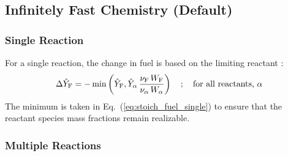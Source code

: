 %
%

\subsection{Infinitely Fast Chemistry (Default)}


\subsubsection{Single Reaction}
For a single reaction, the change in fuel is based on the limiting reactant \cite{Poinsot:TNC}:
\begin{equation}\label{eq:stoich_fuel_single}
\Delta \hat{Y}_{\rm F} = -\min \left( \hat{Y}_{\rm F}, \hat{Y}_{\alpha} \,\frac{\nu_{\rm F}\,W_{\rm F}}{\nu_{\alpha}\,W_{\alpha}}\right) \quad ; \quad \mbox{for all reactants, $\alpha$}
\end{equation}
The minimum is taken in Eq.~(\ref{eq:stoich_fuel_single}) to ensure that the reactant species mass fractions remain realizable. 
\subsubsection{Multiple Reactions}

